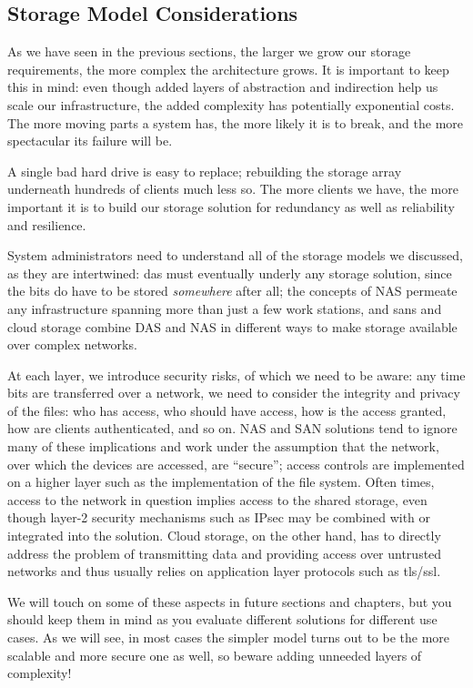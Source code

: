 \subsection{Storage Model Considerations}
\label{file systems:storage-models:considerations}

As we have seen in the previous sections, the larger
we grow our storage requirements, the more complex the
architecture grows.  It is important to keep this in
mind: even though added layers of abstraction and
indirection help us scale our infrastructure, the
added complexity has potentially exponential costs.
The more moving parts a system has, the more likely it
is to break, and the more spectacular its failure will
be.

A single bad hard drive is easy to replace; rebuilding
the storage array underneath hundreds of clients much
less so.  The more clients we have, the more important
it is to build our storage solution for redundancy as
well as reliability and resilience.

System administrators need to understand all of the
storage models we discussed, as they are intertwined:
\gls{das} must eventually underly any storage
solution, since the bits do have to be stored {\em
somewhere} after all; the concepts of NAS permeate any
infrastructure spanning more than just a few work
stations, and \gls{san}s and cloud storage
combine DAS and NAS in different ways to make storage
available over complex networks.

At each layer, we introduce security risks, of which
we need to be aware: any time bits are transferred
over a network, we need to consider the integrity and
privacy of the files: who has access, who should
have access, how is the access granted, how are
clients authenticated, and so on.  NAS and SAN
solutions tend to ignore many of these implications
and work under the assumption that the network, over
which the devices are accessed, are ``secure''; access
controls are implemented on a higher layer such as the
implementation of the file system.  Often times,
access to the network in question implies access to
the shared storage, even though layer-2 security
mechanisms such as IPsec  may be combined
with or integrated into the solution.  Cloud storage,
on the other hand, has to directly address the problem
of transmitting data and providing access over
untrusted networks and thus usually relies on
application layer protocols such as
\gls{tls}/\gls{ssl}.

We will touch on some of these aspects in future
sections and chapters, but you should keep them in
mind as you evaluate different solutions for different
use cases.  As we will see, in most cases the simpler
model turns out to be the more scalable and more
secure one as well, so beware adding unneeded layers
of complexity!



